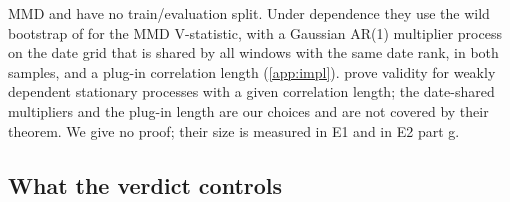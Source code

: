 \begin{table}[tbp]
  \centering
  \caption{Statistic and Driscoll--Kraay standard error of the absolute learned tests in the E1(a)
    placebo (time-block split, 200 replications per cell). joint: the synthetic panel is an
    independent draw of the whole factor panel; indep.: independent synthetic tickers. Mean of
    $T$ with its Monte Carlo standard error, standard deviation of $T$, share of replications with
    $T>0$, median Driscoll--Kraay standard error of $T$, correlation of $T$ with that standard
    error over the replications, and mean of $\zhac$ (as in \cref{tab:e1-sim-z}). Derived from
    \texttt{results/e1/e1\_sim\_raw.csv} by \texttt{paper/scripts/e1\_sim\_stat.py}.}
  \label{tab:manual-e1-sim-stat}
  \small
\end{table}

\begin{remark}\label{rem:wild}
MMD and \SigMMD{} have no train/evaluation split. Under dependence they use the wild bootstrap of
\citet{chwialkowski2014wild} for the MMD V-statistic, with a Gaussian AR(1) multiplier process on
the date grid that is shared by all windows with the same date rank, in both samples, and a
plug-in correlation length (\cref{app:impl}). \citet{chwialkowski2014wild} prove validity for
weakly dependent stationary processes with a given correlation length; the date-shared multipliers
and the plug-in length are our choices and are not covered by their theorem. We give no proof;
their size is measured in E1 and in E2 part g.
\end{remark}

\subsection{What the verdict controls}\label{sec:theory-verdict}

